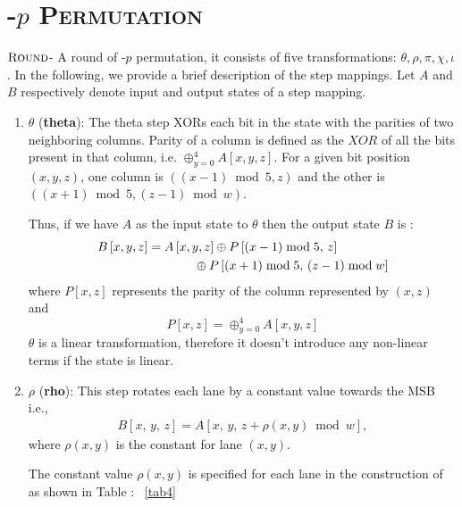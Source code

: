 \section{\textsc{\Keccak-$p$ Permutation}}
$\textsc{Round}$\;- A round of \KECCAK-$p$ permutation, it consists of five transformations: {$\theta,\rho,\pi,\chi,\iota$}. 
In the following, we provide a brief description of the step mappings.
 Let $A$ and $B$ respectively denote input and output states of a step mapping.
\begin{enumerate}
    \item $\theta$ ({\bf theta}): The theta step XORs each bit in the state with the parities of two neighboring columns. 
        Parity of a column is defined as the $XOR$ of all the bits present in that column, i.e. $\oplus_{y = 0}^{4} A[x, y, z]$. For a given bit position $(x, y, z)$, one column is $((x - 1) \bmod 5, z) $ and the other is $((x+1)\bmod 5, (z - 1) \bmod w)$.
    
    Thus, if we have $A$ as the input state to $\theta$ then the output state $B$ is :
    \begin{align}\nonumber
        B\left[x, y, z\right] &= A\left[x, y, z\right] \oplus P\left[ (x - 1) \bmod 5 ,\, z \right] \\
        &\hspace{1.3cm}\oplus P\left[ (x + 1) \bmod 5 ,\, (z - 1) \bmod w \right]
    \end{align}
    where $P[x, z]$ represents the parity of the column represented by $(x, z)$ and 
    \[
        P[x, z]  = \oplus_{y = 0}^{4} A[x, y, z]
    \]
    $\theta$ is a linear transformation, therefore it doesn't introduce any non-linear terms if the state is linear.
    \vskip5pt
    \item $\rho$ ({\bf rho}): This step rotates each lane by a constant value towards the MSB i.e., 
    \begin{align}
        B[x, \,y,\, z] = A[x, \,y, \,z + \rho(x, y) \bmod w ],
    \end{align}
    where $\rho(x, y)$ is the constant for lane $(x, y)$. 
    
        The constant value $\rho(x, y)$ is specified for each lane in the construction of \Keccak{} as shown in Table : ~\ref{tab4} 
        

\end{enumerate}

